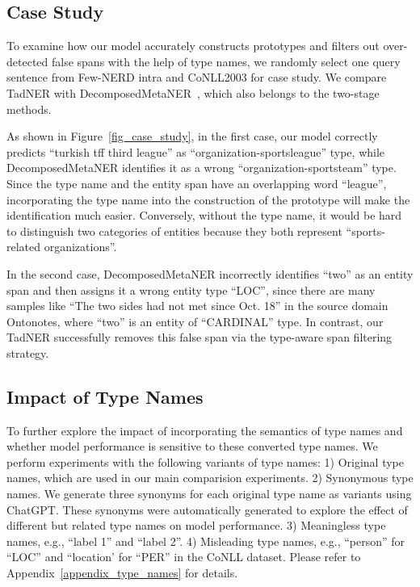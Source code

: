 \documentclass[11pt]{article}
\newcommand{\ours}{{TadNER}\xspace}
\begin{document}
\subsection{Case Study}
To examine how our model accurately constructs prototypes and filters out over-detected false spans  with the help of type names, we randomly select one query sentence from Few-NERD intra and CoNLL2003 for case study.
We compare \ours with DecomposedMetaNER~\cite{ma-etal-2022-decomposed}, which also belongs to the two-stage methods.



As shown in Figure~\ref{fig_case_study}, in the first case, our model correctly predicts ``turkish tff third league'' as ``organization-sportsleague'' type, while DecomposedMetaNER identifies it as a wrong ``organization-sportsteam'' type.
Since the type name and the entity span have an overlapping word ``league'', incorporating the type name into the construction of the prototype will make the identification much easier. Conversely, without the type name, it would be hard to distinguish two categories of entities because they both represent ``sports-related organizations''.

In the second case, DecomposedMetaNER incorrectly identifies ``two'' as an entity span and then assigns it a wrong entity type ``LOC'', since there are many samples like ``The two sides had not met since Oct. 18'' in the source domain Ontonotes, where ``two'' is an entity of ``CARDINAL'' type.
In contrast, our \ours successfully removes this false span via the type-aware span filtering strategy.


\subsection{Impact of Type Names}\label{sec:impact_type_names}
To further explore the impact of incorporating the semantics of type names and whether model performance is sensitive to these converted type names.
We perform experiments with the following variants of type names: 
1) Original type names, which are used in our main comparision experiments.
2) Synonymous type names. We generate three synonyms for each original type name as variants using ChatGPT. These synonyms were automatically generated to explore the effect of different but related type names on model performance.
3) Meaningless type names, e.g., ``label 1'' and ``label 2''.
4) Misleading type names, e.g., ``person'' for ``LOC'' and ``location' for ``PER'' in the CoNLL dataset.
Please refer to Appendix~\ref{appendix_type_names} for details.
\end{document}
